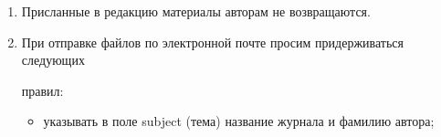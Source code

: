 {\begin{enumerate}[1.]
{semantic dictionary of information monitoring system]. PhD Thesis. Moscow: IPI RAN. 23~p.








\noindent


\textbf{Описание ГОСТа:}





GOST 8.586.5-2005. 2007. Metodika vypolneniya izmereniy. Izmerenie raskhoda i kolichestva zhidkostey i gazov s


pomoshch'yu standartnykh suzhayushchikh ustroystv [Method of measurement.


Measurement of flow rate and volume of liquids and gases by means of orifice devices]. Moscow:


Standardinform  Publs. 10~p.





\noindent


\textbf{Описание патента:}





.


2006. Sposob orientirovaniya po krenu letatel'nogo


apparata s opti\-che\-skoy golovkoy


samonavedeniya [The way to orient on the roll of aircraft with optical homing head].


Patent RF No.\,2280590.


}





\item Присланные в редакцию материалы авторам не возвращаются.\\[-13.5pt]





\item При отправке файлов по электронной почте просим придерживаться следующих


правил:


\begin{itemize}


\item указывать в поле subject (тема) название журнала и фамилию автора;\\[-13.5pt]



\end{itemize}
\end{enumerate}}
